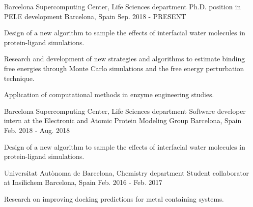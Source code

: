 
\begin{cventries}

  \cventry
    {Barcelona Supercomputing Center, Life Sciences department} %
    {Ph.D. position in PELE development} %
    {Barcelona, Spain} %
    {Sep. 2018 - PRESENT} %
    {
      \begin{cvitems} %
        \item {Design of a new algorithm to sample the effects of interfacial water molecules in protein-ligand simulations.}
        \item {Research and development of new strategies and algorithms to estimate binding free energies through Monte Carlo simulations and the free energy perturbation technique.}
        \item {Application of computational methods in enzyme engineering studies.}
      \end{cvitems}
    }

  \cventry
    {Barcelona Supercomputing Center, Life Sciences department} %
    {Software developer intern at the Electronic and Atomic Protein Modeling Group} %
    {Barcelona, Spain} %
    {Feb. 2018 - Aug. 2018} %
    {
      \begin{cvitems} %
        \item {Design of a new algorithm to sample the effects of interfacial water molecules in protein-ligand simulations.}
      \end{cvitems}
    }

  \cventry
    {Universitat Autònoma de Barcelona, Chemistry department} %
    {Student collaborator at Insilichem} %
    {Barcelona, Spain} %
    {Feb. 2016 - Feb. 2017} %
    {
      \begin{cvitems} %
        \item {Research on improving docking predictions for metal containing systems.}
      \end{cvitems}
    }

\end{cventries}
